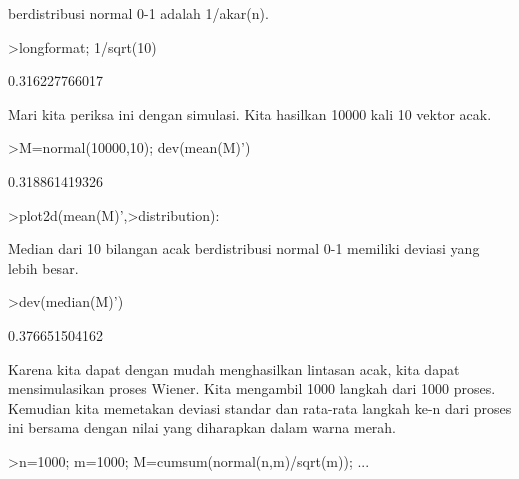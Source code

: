 \documentclass[a4paper,10pt]{article}
\begin{document}
\begin{eulernotebook}
\begin{eulercomment}
\begin{eulercomment}
\begin{eulercomment}
\begin{eulercomment}
\begin{eulercomment}
\begin{eulercomment}
\begin{eulercomment}
\begin{eulercomment}
\begin{eulercomment}
\begin{eulercomment}
\begin{eulercomment}
\begin{eulercomment}
\begin{eulercomment}
\begin{eulercomment}
\begin{eulercomment}
\begin{eulercomment}
\begin{eulercomment}
\begin{eulercomment}
\begin{eulercomment}
\begin{eulercomment}
\begin{eulercomment}
\begin{eulercomment}
\begin{eulercomment}
\begin{eulercomment}
\begin{eulercomment}
\begin{eulercomment}
\begin{eulercomment}
\begin{eulercomment}
\begin{eulercomment}
\begin{eulercomment}
\begin{eulercomment}
\begin{eulercomment}
\begin{eulercomment}
berdistribusi normal 0-1 adalah 1/akar(n).
\end{eulercomment}
\begin{eulerprompt}
>longformat; 1/sqrt(10)
\end{eulerprompt}
\begin{euleroutput}
  0.316227766017
\end{euleroutput}
\begin{eulercomment}
Mari kita periksa ini dengan simulasi. Kita hasilkan 10000 kali 10
vektor acak.
\end{eulercomment}
\begin{eulerprompt}
>M=normal(10000,10); dev(mean(M)')
\end{eulerprompt}
\begin{euleroutput}
  0.318861419326
\end{euleroutput}
\begin{eulerprompt}
>plot2d(mean(M)',>distribution):
\end{eulerprompt}
\begin{eulercomment}
Median dari 10 bilangan acak berdistribusi normal 0-1 memiliki deviasi
yang lebih besar.
\end{eulercomment}
\begin{eulerprompt}
>dev(median(M)')
\end{eulerprompt}
\begin{euleroutput}
  0.376651504162
\end{euleroutput}
\begin{eulercomment}
Karena kita dapat dengan mudah menghasilkan lintasan acak, kita dapat
mensimulasikan proses Wiener. Kita mengambil 1000 langkah dari 1000
proses. Kemudian kita memetakan deviasi standar dan rata-rata langkah
ke-n dari proses ini bersama dengan nilai yang diharapkan dalam warna
merah.
\end{eulercomment}
\begin{eulerprompt}
>n=1000; m=1000; M=cumsum(normal(n,m)/sqrt(m)); ...

\end{eulerprompt}
\end{eulercomment}
\end{eulercomment}
\end{eulercomment}
\end{eulercomment}
\end{eulercomment}
\end{eulercomment}
\end{eulercomment}
\end{eulercomment}
\end{eulercomment}
\end{eulercomment}
\end{eulercomment}
\end{eulercomment}
\end{eulercomment}
\end{eulercomment}
\end{eulercomment}
\end{eulercomment}
\end{eulercomment}
\end{eulercomment}
\end{eulercomment}
\end{eulercomment}
\end{eulercomment}
\end{eulercomment}
\end{eulercomment}
\end{eulercomment}
\end{eulercomment}
\end{eulercomment}
\end{eulercomment}
\end{eulercomment}
\end{eulercomment}
\end{eulercomment}
\end{eulercomment}
\end{eulercomment}
\end{eulernotebook}
\end{document}
